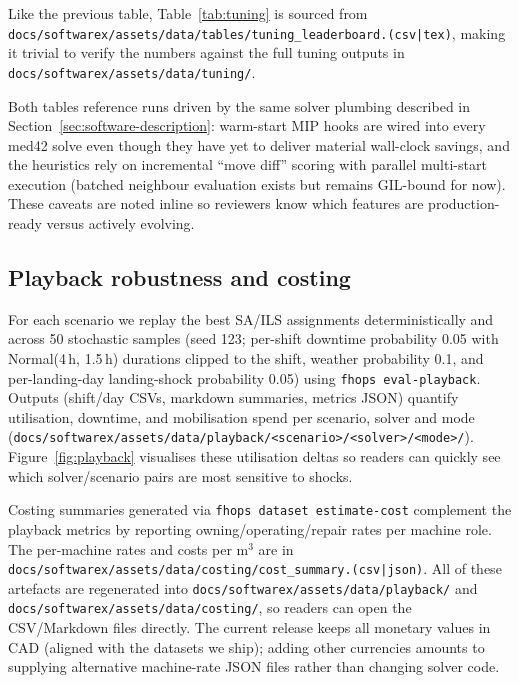 \begin{table}[t]
  \centering
  \caption{Best-performing tuner per scenario. $\Delta$ = best tuned objective minus the SA default benchmark objective; the tuner's budget (Budget column) is far smaller than the SA default benchmark budget given in the table note.}
  \label{tab:tuning}
  
\end{table}
Like the previous table, Table~\ref{tab:tuning} is sourced from \texttt{docs/softwarex/assets/data/tables/tuning\_leaderboard.(csv|tex)}, making it trivial to verify the numbers against the full tuning outputs in \texttt{docs/softwarex/assets/data/tuning/}.

Both tables reference runs driven by the same solver plumbing described in Section~\ref{sec:software-description}: warm-start MIP hooks are wired into every med42 solve even though they have yet to deliver material wall-clock savings, and the heuristics rely on incremental “move diff” scoring with parallel multi-start execution (batched neighbour evaluation exists but remains GIL-bound for now). These caveats are noted inline so reviewers know which features are production-ready versus actively evolving.

\subsection{Playback robustness and costing}
For each scenario we replay the best SA/ILS assignments deterministically and across 50 stochastic samples (seed 123; per-shift downtime probability 0.05 with Normal(4\,h, 1.5\,h) durations clipped to the shift, weather probability 0.1, and per-landing-day landing-shock probability 0.05) using \texttt{fhops eval-playback}. Outputs (shift/day CSVs, markdown summaries, metrics JSON) quantify utilisation, downtime, and mobilisation spend per scenario, solver and mode (\texttt{docs/softwarex/assets/data/playback/<scenario>/<solver>/<mode>/}). Figure~\ref{fig:playback} visualises these utilisation deltas so readers can quickly see which solver/scenario pairs are most sensitive to shocks.

Costing summaries generated via \texttt{fhops dataset estimate-cost} complement the playback metrics by reporting owning/operating/repair rates per machine role. The per-machine rates and costs per m$^3$ are in \texttt{docs/softwarex/assets/data/costing/cost\_summary.(csv|json)}.
All of these artefacts are regenerated into \texttt{docs/softwarex/assets/data/playback/} and \texttt{docs/softwarex/assets/data/costing/}, so readers can open the CSV/Markdown files directly. The current release keeps all monetary values in CAD (aligned with the datasets we ship); adding other currencies amounts to supplying alternative machine-rate JSON files rather than changing solver code.

